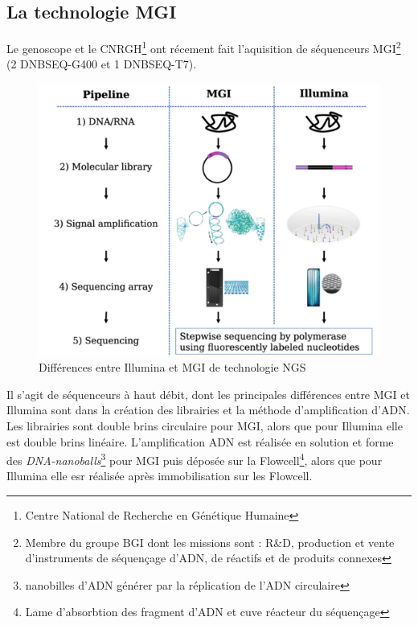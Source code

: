 \subsection{La technologie MGI}
Le genoscope et le CNRGH\footnote{Centre National de Recherche en Génétique Humaine} ont récement fait l'aquisition de séquenceurs MGI\footnote{Membre du groupe BGI dont les missions sont : R\&D, production et vente d'instruments de séquençage d'ADN, de réactifs et de produits connexes} (2 DNBSEQ-G400 et 1 DNBSEQ-T7).


\begin{minipage}{0.45\textwidth}
	\begin{figure}[H]
        \centering
        \includegraphics[width=1\textwidth]{img/MGI_vs_Illumina.png}
        \caption{\footnotesize{Différences entre Illumina et MGI de technologie NGS}}
        \label{fig-Illu-vs-MGI}
    \end{figure}
\end{minipage} 
\hfill
\begin{minipage}{0.45\textwidth}
    Il s'agit de séquenceurs à haut débit, dont les principales différences entre MGI et Illumina sont dans la création des librairies et la méthode d'amplification d'ADN. Les librairies sont double brins circulaire pour MGI, alors que pour Illumina elle est double brins linéaire. L'amplification ADN est réalisée en solution et forme des \emph{DNA-nanoballs}\footnote{nanobilles d'ADN générer par la réplication de l'ADN circulaire} pour MGI puis déposée sur la Flowcell\footnote{Lame d'absorbtion des fragment d'ADN et cuve réacteur du séquençage}, alors que pour Illumina elle esr réalisée après immobilisation sur les Flowcell.
\end{minipage}


